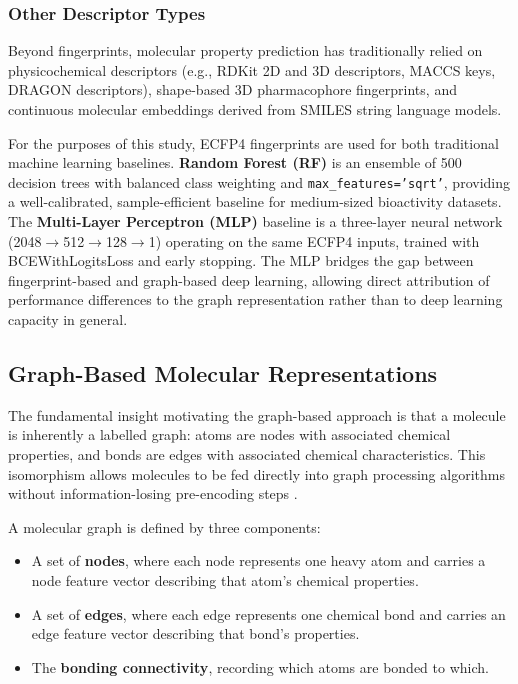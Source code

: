 \subsubsection{Other Descriptor Types}

Beyond fingerprints, molecular property prediction has traditionally relied on
physicochemical descriptors (e.g., RDKit 2D and 3D descriptors, MACCS keys,
DRAGON descriptors), shape-based 3D pharmacophore fingerprints, and continuous
molecular embeddings derived from SMILES string language models.

For the purposes of this study, ECFP4 fingerprints are used for both traditional
machine learning baselines. \textbf{Random Forest (RF)} is an ensemble of 500
decision trees with balanced class weighting and \texttt{max\_features='sqrt'},
providing a well-calibrated, sample-efficient baseline for medium-sized bioactivity
datasets. The \textbf{Multi-Layer Perceptron (MLP)} baseline is a three-layer
neural network (2048$\to$512$\to$128$\to$1) operating on the same ECFP4 inputs,
trained with BCEWithLogitsLoss and early stopping. The MLP bridges the gap between
fingerprint-based and graph-based deep learning, allowing direct attribution of
performance differences to the graph representation rather than to deep learning
capacity in general.

\subsection{Graph-Based Molecular Representations}

The fundamental insight motivating the graph-based approach is that a molecule
is inherently a labelled graph: atoms are nodes with associated chemical properties,
and bonds are edges with associated chemical characteristics. This isomorphism
allows molecules to be fed directly into graph processing algorithms without
information-losing pre-encoding steps \parencite{gilmer2017neural}.

A molecular graph is defined by three components:
\begin{itemize}
    \item A set of \textbf{nodes}, where each node represents one heavy atom and
    carries a node feature vector describing that atom's chemical properties.
    \item A set of \textbf{edges}, where each edge represents one chemical bond and
    carries an edge feature vector describing that bond's properties.
    \item The \textbf{bonding connectivity}, recording which atoms are bonded to
    which.
\end{itemize}

